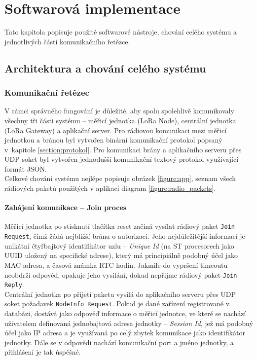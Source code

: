 

\chapter{Softwarová implementace}
    Tato kapitola popisuje použité softwarové nástroje, chování celého systému a jednotlivých částí komunikačního řetězce.

\section{Architektura a chování celého systému}
    
    \subsection{Komunikační řetězec}
    V rámci správného fungování je důležité, aby spolu spolehlivě komunikovaly všechny tři části systému – měřicí jednotka (LoRa Node), centrální jednotka (LoRa Gateway) a aplikační server.
    Pro rádiovou komunikaci mezi měřicí jednotkou a bránou byl vytvořen binární komunikační protokol popsaný v~kapitole \ref{section:protokol}. Pro komunikaci brány a aplikačního serveru přes UDP soket byl vytvořen jednodušší komunikační textový protokol využívající formát JSON.\\
    Celkové chování systému nejlépe popisuje obrázek \ref{figure:app}, seznam všech rádiových paketů použitých v aplikaci diagram \ref{figure:radio_packets}.
    
    \subsubsection{Zahájení komunikace – Join proces}
    \label{section:join}
    Měřicí jednotka po stisknutí tlačítka reset začíná vysílat rádiový paket \texttt{Join Request}, čímž žádá nejbližší bránu o autorizaci. Jeho nejdůležitější informací je unikátní čtyřbajtový identifikátor uzlu – \textit{Unique Id} (na ST procesorech jako UUID uložený na specifické adrese), který má principiálně podobný účel jako MAC adresa, a časová známka RTC hodin. Jakmile do vypršení timeoutu neobdrží odpověď, opakuje jeho vysílání, dokud nepřijme rádiový paket \texttt{Join Reply}.\\
    Centrální jednotka po přijetí paketu vysílá do aplikačního serveru přes UDP soket požadavek \texttt{NodeInfo Request}. Pokud je dané zařízení registrované v databázi, dostává jako odpověď informace o měřicí jednotce, ve které se nachází uživatelem definovaná jednobajtová adresa jednotky – \textit{Session Id}, jež má podobný účel jako IP adresa a je využívaná po celý zbytek komunikace jako identifikátor jednotky. Dále se v odpovědi nachází komunikační port a jméno jednotky, a přihlášení je tak úspěšné.
    
